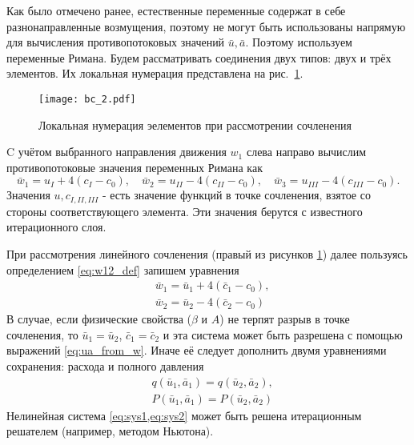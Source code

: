 Как было отмечено ранее, естественные переменные содержат в себе разнонаправленные возмущения, поэтому
не могут быть использованы напрямую для вычисления противопотоковых значений $\bar u, \bar a$.
Поэтому используем переменные Римана. 
Будем рассматривать соединения двух типов: двух и трёх элементов. Их локальная нумерация
представлена на рис.~\ref{fig:bc_2}.

\begin{figure}[h]
    \centering
    \texttt{[image: bc\_2.pdf]}
    \caption{Локальная нумерация эелементов при рассмотрении сочленения}
    \label{fig:bc_2}
\end{figure}

C учётом выбранного направления движения $w_1$ слева направо
вычислим противопотоковые значения переменных Римана как
\begin{equation*}
\bar w_1 = u_I + 4 (c_I - c_0), \quad \bar w_2 = u_{II} - 4 (c_{II} - c_0), \quad \bar w_3 = u_{III} - 4 (c_{III} - c_0).
\end{equation*}
Значения $u,c_{I,II,III}$ - есть значение функций в точке сочленения, взятое
со стороны соответствующего элемента. Эти значения берутся с известного итерационного слоя.

При рассмотрения линейного сочленения (правый из рисунков \ref{fig:bc_2})
далее пользуясь определением \cref{eq:w12_def}
запишем уравнения
\begin{equation}
\label{eq:sys2}
\begin{aligned}
&\bar w_1 = \bar u_1 + 4 (\bar c_1 - c_0), \\
&\bar w_2 = \bar u_2 - 4 (\bar c_2 - c_0)
\end{aligned}
\end{equation}
В случае, если физические свойства ($\beta$ и $A$) не терпят разрыв в точке сочленения,
то $\bar u_1 = \bar u_2$, $\bar c_1 = \bar c_2$ и эта система
может быть разрешена с помощью выражений
\cref{eq:ua_from_w}. Иначе её следует дополнить двумя уравнениями сохранения: расхода и полного давления
\begin{equation}
\label{eq:sys1}
\begin{aligned}
&q(\bar u_1, \bar a_1) = q(\bar u_2, \bar a_2), \\
&P(\bar u_1, \bar a_1) = P(\bar u_2, \bar a_2)
\end{aligned}
\end{equation}
Нелинейная система \cref{eq:sys1,eq:sys2} может быть решена итерационным решателем (например, методом Ньютона).

